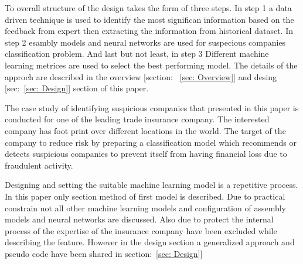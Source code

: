 To overall structure of the design takes the form of three steps. In step 1 a data driven technique is used to identify the most significan information based on the feedback from expert then extracting the information from historical dataset. In step 2 esambly models and neural networks are used for suspecious companies classification problem. And last but not least, in step 3 Different machine learning metrices are used to select the best performing model. The details of the approch are described in the overview [section: ~\ref{sec: Overview}] and desing [sec:~\ref{sec: Design}] section of this paper.


The case study of identifying suspicious companies that presented in this paper is conducted for one of the leading trade insurance company. The interested company has foot print over different locations in the world. The target of the company to reduce risk by preparing a classification model which recommends or detects suspicious companies to prevent itself from having financial loss due to fraudulent activity.


Designing and setting the suitable machine learning model is a repetitive process. In this paper only section method of first model is described. Due to practical constrain not all other machine learning models and configuration of assembly models and neural networks are discussed. Also due to protect the internal process of the expertise of the insurance company have been excluded while describing the feature. However in the design section a generalized approach and pseudo code have been shared in section:~\ref{sec: Design}]






